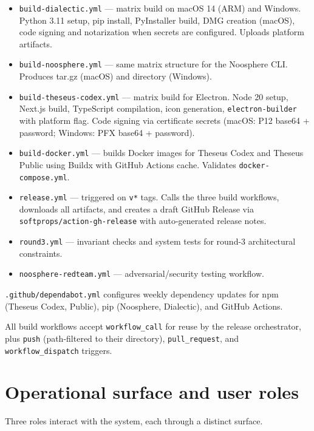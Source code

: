 \documentclass[11pt,letterpaper]{article}
\newcommand{\file}[1]{\texttt{#1}}
\begin{document}
\begin{itemize}[leftmargin=1.5em,itemsep=0.1em]
  \item \file{build-dialectic.yml} --- matrix build on macOS 14 (ARM) and Windows. Python 3.11 setup, pip install, PyInstaller build, DMG creation (macOS), code signing and notarization when secrets are configured. Uploads platform artifacts.
  \item \file{build-noosphere.yml} --- same matrix structure for the Noosphere CLI. Produces tar.gz (macOS) and directory (Windows).
  \item \file{build-theseus-codex.yml} --- matrix build for Electron. Node 20 setup, Next.js build, TypeScript compilation, icon generation, \texttt{electron-builder} with platform flag. Code signing via certificate secrets (macOS: P12 base64 + password; Windows: PFX base64 + password).
  \item \file{build-docker.yml} --- builds Docker images for Theseus Codex and Theseus Public using Buildx with GitHub Actions cache. Validates \texttt{docker-compose.yml}.
  \item \file{release.yml} --- triggered on \texttt{v*} tags. Calls the three build workflows, downloads all artifacts, and creates a draft GitHub Release via \texttt{softprops/action-gh-release} with auto-generated release notes.
  \item \file{round3.yml} --- invariant checks and system tests for round-3 architectural constraints.
  \item \file{noosphere-redteam.yml} --- adversarial/security testing workflow.
\end{itemize}

\file{.github/dependabot.yml} configures weekly dependency updates for npm (Theseus Codex, Public), pip (Noosphere, Dialectic), and GitHub Actions.

All build workflows accept \texttt{workflow\_call} for reuse by the release orchestrator, plus \texttt{push} (path-filtered to their directory), \texttt{pull\_request}, and \texttt{workflow\_dispatch} triggers.

\section{Operational surface and user roles}

Three roles interact with the system, each through a distinct surface.
\end{document}
